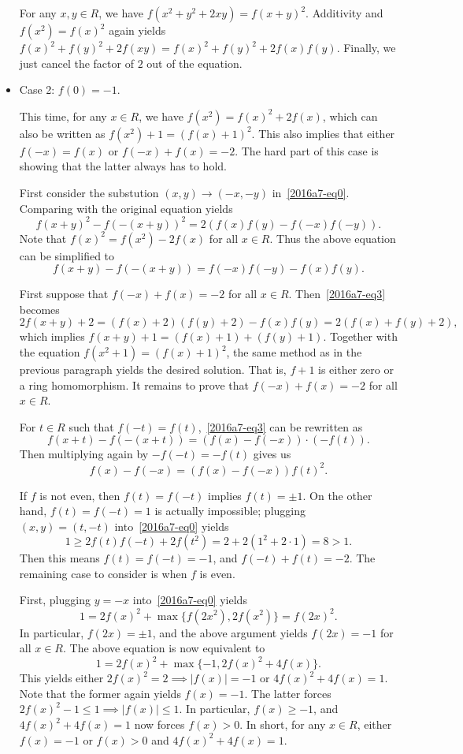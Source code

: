 \documentclass{article}
\begin{document}
\begin{itemize}
    For any $x, y \in R$, we have $f(x^2 + y^2 + 2xy) = f(x + y)^2$.
    Additivity and $f(x^2) = f(x)^2$ again yields $f(x)^2 + f(y)^2 + 2 f(xy) = f(x)^2 + f(y)^2 + 2 f(x) f(y)$.
    Finally, we just cancel the factor of $2$ out of the equation.


    
    \item
    Case 2: $f(0) = -1$.
    
    This time, for any $x \in R$, we have $f(x^2) = f(x)^2 + 2 f(x)$, which can also be written as $f(x^2) + 1 = (f(x) + 1)^2$.
    This also implies that either $f(-x) = f(x)$ or $f(-x) + f(x) = -2$.
    The hard part of this case is showing that the latter always has to hold.

    First consider the substution $(x, y) \to (-x, -y)$ in~\eqref{2016a7-eq0}.
    Comparing with the original equation yields
    \[ f(x + y)^2 - f(-(x + y))^2 = 2 (f(x) f(y) - f(-x) f(-y)). \]
    Note that $f(x)^2 = f(x^2) - 2 f(x)$ for all $x \in R$.
    Thus the above equation can be simplified to
    \[ f(x + y) - f(-(x + y)) = f(-x) f(-y) - f(x) f(y). \tag{3}\label{2016a7-eq3}\]

    First suppose that $f(-x) + f(x) = -2$ for all $x \in R$.
    Then~\eqref{2016a7-eq3} becomes
    \[ 2 f(x + y) + 2 = (f(x) + 2)(f(y) + 2) - f(x) f(y) = 2 (f(x) + f(y) + 2), \]
        which implies $f(x + y) + 1 = (f(x) + 1) + (f(y) + 1)$.
    Together with the equation $f(x^2 + 1) = (f(x) + 1)^2$, the same method as in the previous paragraph yields the desired solution.
    That is, $f + 1$ is either zero or a ring homomorphism.
    It remains to prove that $f(-x) + f(x) = -2$ for all $x \in R$.

    For $t \in R$ such that $f(-t) = f(t)$,~\eqref{2016a7-eq3} can be rewritten as
    \[ f(x + t) - f(-(x + t)) = (f(x) - f(-x)) \cdot (-f(t)). \]
    Then multiplying again by $-f(-t) = -f(t)$ gives us
    \[ f(x) - f(-x) = (f(x) - f(-x)) f(t)^2. \]

    If $f$ is not even, then $f(t) = f(-t)$ implies $f(t) = \pm 1$.
    On the other hand, $f(t) = f(-t) = 1$ is actually impossible; plugging $(x, y) = (t, -t)$ into~\eqref{2016a7-eq0} yields
    \[ 1 \geq 2 f(t) f(-t) + 2 f(t^2) = 2 + 2 (1^2 + 2 \cdot 1) = 8 > 1. \]
    Then this means $f(t) = f(-t) = -1$, and $f(-t) + f(t) = -2$.
    The remaining case to consider is when $f$ is even.

    First, plugging $y = -x$ into~\eqref{2016a7-eq0} yields
    \[ 1 = 2 f(x)^2 + \max\{f(2x^2), 2 f(x^2)\} = f(2x)^2. \]
    In particular, $f(2x) = \pm 1$, and the above argument yields $f(2x) = -1$ for all $x \in R$.
    The above equation is now equivalent to
    \[ 1 = 2 f(x)^2 + \max\{-1, 2 f(x)^2 + 4 f(x)\}. \]
    This yields either $2 f(x)^2 = 2 \implies |f(x)| = -1$ or $4 f(x)^2 + 4 f(x) = 1$.
    Note that the former again yields $f(x) = -1$.
    The latter forces $2 f(x)^2 - 1 \leq 1 \implies |f(x)| \leq 1$.
    In particular, $f(x) \geq -1$, and $4 f(x)^2 + 4 f(x) = 1$ now forces $f(x) > 0$.
    In short, for any $x \in R$, either $f(x) = -1$ or $f(x) > 0$ and $4 f(x)^2 + 4 f(x) = 1$.


\end{itemize}
\end{document}
